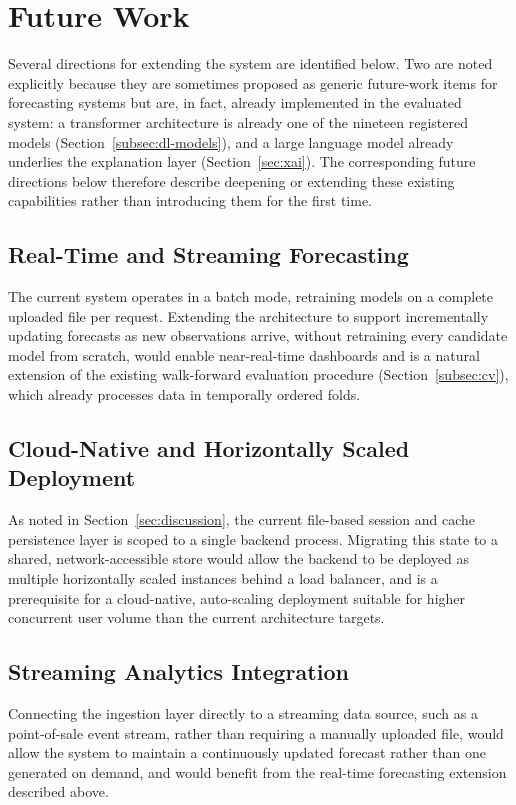 \section{Future Work}
\label{sec:future}

Several directions for extending the system are identified below. Two are noted explicitly because they are sometimes proposed as generic future-work items for forecasting systems but are, in fact, already implemented in the evaluated system: a transformer architecture is already one of the nineteen registered models (Section~\ref{subsec:dl-models}), and a large language model already underlies the explanation layer (Section~\ref{sec:xai}). The corresponding future directions below therefore describe deepening or extending these existing capabilities rather than introducing them for the first time.

\subsection{Real-Time and Streaming Forecasting}
The current system operates in a batch mode, retraining models on a complete uploaded file per request. Extending the architecture to support incrementally updating forecasts as new observations arrive, without retraining every candidate model from scratch, would enable near-real-time dashboards and is a natural extension of the existing walk-forward evaluation procedure (Section~\ref{subsec:cv}), which already processes data in temporally ordered folds.

\subsection{Cloud-Native and Horizontally Scaled Deployment}
As noted in Section~\ref{sec:discussion}, the current file-based session and cache persistence layer is scoped to a single backend process. Migrating this state to a shared, network-accessible store would allow the backend to be deployed as multiple horizontally scaled instances behind a load balancer, and is a prerequisite for a cloud-native, auto-scaling deployment suitable for higher concurrent user volume than the current architecture targets.

\subsection{Streaming Analytics Integration}
Connecting the ingestion layer directly to a streaming data source, such as a point-of-sale event stream, rather than requiring a manually uploaded file, would allow the system to maintain a continuously updated forecast rather than one generated on demand, and would benefit from the real-time forecasting extension described above.

